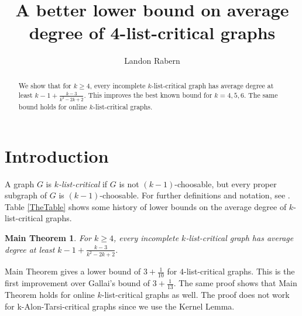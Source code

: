 \documentclass[12pt]{article}
\title{A better lower bound on average degree of 4-list-critical graphs}
\author{Landon Rabern}
\theoremstyle{plain}
\newtheorem*{MainTheorem}{Main Theorem}
\theoremstyle{definition}
\theoremstyle{remark}
\begin{document}
\maketitle
\begin{abstract}
		We show that for $k \ge 4$, every incomplete $k$-list-critical graph has average degree at least $k-1 + \frac{k-3}{k^2-2k+2}$.  This improves the best known bound for $k = 4,5,6$.
		The same bound holds for online $k$-list-critical graphs.
\end{abstract}

\section{Introduction}
A graph $G$ is \emph{$k$-list-critical} if $G$ is not $(k-1)$-choosable, but every
proper subgraph of $G$ is $(k-1)$-choosable.  For further definitions and notation, see \cite{OreVizing, DischargingLowerBound}. 
Table \ref{TheTable} shows some history of lower bounds on the average degree of $k$-list-critical graphs.

\begin{MainTheorem}
	For $k \ge 4$, every incomplete $k$-list-critical graph has average degree at least $k-1 + \frac{k-3}{k^2-2k+2}$.
\end{MainTheorem}

Main Theorem gives a lower bound of $3 + \frac{1}{10}$ for $4$-list-critical graphs. This is the first improvement over Gallai's bound of $3 + \frac{1}{13}$. 
The same proof shows that Main Theorem holds for online $k$-list-critical graphs as well.  The proof does not work for k-Alon-Tarsi-critical graphs since we use the Kernel Lemma.
\end{document}
